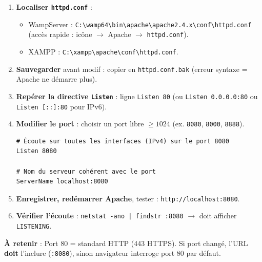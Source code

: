 \documentclass[11pt]{article}
\begin{document}
\begin{methode}
\begin{enumerate}
\item \textbf{Localiser \texttt{httpd.conf}} :
\begin{itemize}
\item WampServer : \texttt{C:\textbackslash wamp64\textbackslash bin\textbackslash apache\textbackslash apache2.4.x\textbackslash conf\textbackslash httpd.conf} (accès rapide : icône $\rightarrow$ Apache $\rightarrow$ \texttt{httpd.conf}).
\item XAMPP : \texttt{C:\textbackslash xampp\textbackslash apache\textbackslash conf\textbackslash httpd.conf}.
\end{itemize}
\item \textbf{Sauvegarder} avant modif : copier en \texttt{httpd.conf.bak} (erreur syntaxe = Apache ne démarre plus).
\item \textbf{Repérer la directive \texttt{Listen}} : ligne \texttt{Listen 80} (ou \texttt{Listen 0.0.0.0:80} ou \texttt{Listen [::]:80} pour IPv6).
\item \textbf{Modifier le port} : choisir un port libre $\ge 1024$ (ex. \texttt{8080}, \texttt{8000}, \texttt{8888}).
\begin{lstlisting}[language=apacheconf]
# Écoute sur toutes les interfaces (IPv4) sur le port 8080
Listen 8080

# Nom du serveur cohérent avec le port
ServerName localhost:8080
\end{lstlisting}
\item \textbf{Enregistrer, redémarrer Apache}, tester : \texttt{http://localhost:8080}.
\item \textbf{Vérifier l'écoute} : \texttt{netstat -ano | findstr :8080} $\rightarrow$ doit afficher \texttt{LISTENING}.
\end{enumerate}
\textbf{À retenir} : Port 80 = standard HTTP (443 HTTPS). Si port changé, l'URL \textbf{doit} l'inclure (\texttt{:8080}), sinon navigateur interroge port 80 par défaut.
\end{methode}
\end{document}
